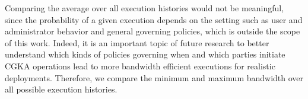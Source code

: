 

Comparing the average over all execution histories would not be meaningful, since the probability of a given execution depends on the setting such as user and administrator behavior and general
governing policies, which is outside the
scope of this work. Indeed, it is an important topic of future research to
better understand which kinds of policies governing when and which parties
initiate CGKA operations lead to more bandwidth efficient executions for
realistic deployments. Therefore, we compare the minimum and maximum bandwidth over all possible execution histories.


%


